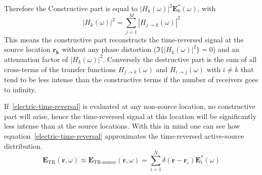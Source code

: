 Therefore the Constructive part is equal to \(|H_k(\omega)|^2 \bm{E}^*_k(\omega)\), with
\begin{equation}
    |H_k(\omega)|^2 = \sum_{j=1}^{M} |H_{j\rightarrow k}(\omega)|^2
\end{equation}
This means the constructive part reconstructs the time-reversed signal at the source location \(\bm{r_k}\) without any phase distortion (\(\Im \{{|H_k(\omega)|^2}\} = 0\)) and an attenuation factor of \(|H_k(\omega)|^2\).
Conversely the destructive part is the sum of all cross-terms of the transfer functions \(H_{j\rightarrow k}(\omega)\) and \(H_{i\rightarrow j}(\omega)\) with \(i \neq k\) that tend to be less intense than the constructive terms if the number of receivers goes to infinity.

If~\eqref{electric-time-reversal} is evaluated at any non-source location, no constructive part will arise, hence the time-reversed signal at this location will be significantly less intense than at the source locations.
With this in mind one can see how equation~\eqref{electric-time-reversal} approximates the time-reversed active-source distribution. 
\begin{equation}
    \bm{E}_{\text{TR}}(\bm{r}, \omega) \approx \bm{E}_{\text{TR-source}}(\bm{r}, \omega) =  \sum_{i=1}^{N} \delta(\bm{r}-\bm{r}_i) \bm{E}^*_i(\omega)
\end{equation}

